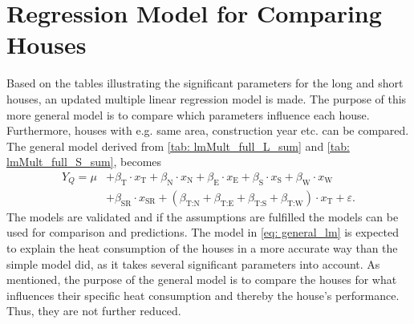 \begin{table}
    \centering
\caption{The distribution of significant parameters from the multiple linear regression model for short houses. As for the long houses, the total of the significance is in relation to the number of long houses.}
\label{tab: lmMult_full_S_sum}
\end{table}



\section{Regression Model for Comparing Houses}
Based on the tables illustrating the significant parameters for the long and short houses, an updated multiple linear regression model is made. The purpose of this more general model is to compare which parameters influence each house. Furthermore, houses with e.g. same area, construction year etc. can be compared. The general model derived from \cref{tab: lmMult_full_L_sum} and \cref{tab: lmMult_full_S_sum}, becomes
\begin{align}
        Y_{Q} = \mu & + \beta_{\text{T}}\cdot x_{\text{T}} + \beta_{\text{N}}\cdot x_{\text{N}} + \beta_{\text{E}}\cdot x_{\text{E}}+ \beta_{\text{S}}\cdot x_{\text{S}} + \beta_{\text{W}}\cdot x_{\text{W}} \nonumber \\ & + \beta_{\text{SR}}\cdot x_{\text{SR}} + (\beta_{\text{T:N}} + \beta_{\text{T:E}} + \beta_{\text{T:S}} + \beta_{\text{T:W}}) \cdot x_{\text{T}} + \varepsilon. \label{eq: general_lm}
\end{align}
The models are validated and if the assumptions are fulfilled the models can be used for comparison and predictions. The model in \cref{eq: general_lm} is expected to explain the heat consumption of the houses in a more accurate way than the simple model did, as it takes several significant parameters into account. As mentioned, the purpose of the general model is to compare the houses for what influences their specific heat consumption and thereby the house's performance. Thus, they are not further reduced.

